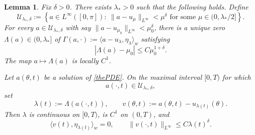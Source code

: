 \documentclass[11pt,a4paper]{article}
\numberwithin{equation}{section}
\theoremstyle{plain}
\newtheorem{lemma}[theorem]{Lemma}
\theoremstyle{remark}
\begin{document}
\begin{lemma}\label{tubeee_eta}
Fix $\delta>0$. There exists $\lambda_*>0$ such that the following holds. Define
$$
\mathcal U_{\lambda_*,\delta}
:=
\left\{
a\in L^\infty([0,\pi]):
\ \|a-u_\mu\|_{L^\infty}<\mu^\delta
\text{ for some }\mu\in(0,\lambda_*/2]
\right\}.
$$
For every $a\in\mathcal U_{\lambda_*,\delta}$ with say $\|a-u_{\mu_0}\|_{L^\infty}<\mu_0^\delta$, there is a unique zero $\Lambda(a)\in(0,\lambda_*]$ of
$\Gamma(a,\cdot):=
\langle a-u_\lambda,\eta_\lambda\rangle_w$ satisfying
\begin{equation}\label{witnessbound}
|\Lambda(a)-\mu_0|
\leq
C\mu_0^{1+\delta}.
\end{equation}
The map $a\mapsto\Lambda(a)$ is locally $C^1$.

Let $a(\theta,t)$ be a solution of \eqref{thePDE}. On the maximal
interval $[0,T)$ for which
$$
a(\cdot,t)\in\mathcal U_{\lambda_*,\delta},
$$
set
$$
\lambda(t):=\Lambda(a(\cdot,t)),
\qquad
v(\theta,t):=a(\theta,t)-u_{\lambda(t)}(\theta).
$$
Then $\lambda$ is continuous on $[0,T)$, is $C^1$ on
$(0,T)$, and
$$
\langle v(t),\eta_{\lambda(t)}\rangle_w=0,
\qquad
\|v(\cdot,t)\|_{L^\infty}
\leq
C\lambda(t)^\delta.
$$
\end{lemma}
\end{document}
